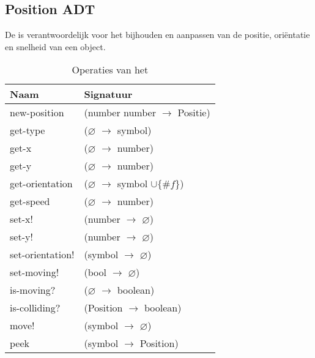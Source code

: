 \subsection{Position ADT}
\label{section:positie}

De \texttt{} is verantwoordelijk voor het bijhouden en aanpassen van de positie, oriëntatie en snelheid van een object.

\begin{table}[hbt]
\centering
\begin{tabular}{|ll|}
\hline
\rowcolor[HTML]{000000} 
{\color[HTML]{FFFFFF} \textbf{Naam}} & {\color[HTML]{FFFFFF} \textbf{Signatuur}} \\ \hline
new-position     & (number number $\rightarrow$ Positie)                       \\ \hline
get-type         & ($\varnothing$ $\rightarrow$ symbol)                        \\ \hline
get-x            & ($\varnothing$ $\rightarrow$ number)                        \\ \hline
get-y            & ($\varnothing$ $\rightarrow$ number)                        \\ \hline
get-orientation  & ($\varnothing$ $\rightarrow$ symbol $\cup\{\#f\}$)          \\ \hline
get-speed        & ($\varnothing$ $\rightarrow$ number)                        \\ \hline
set-x!           & (number $\rightarrow$ $\varnothing$)                        \\ \hline
set-y!           & (number $\rightarrow$ $\varnothing$)                        \\ \hline
set-orientation! & (symbol $\rightarrow$ $\varnothing$)                        \\ \hline
set-moving!      & (bool $\rightarrow$ $\varnothing$)                          \\ \hline
is-moving?       & ($\varnothing$ $\rightarrow$ boolean)                       \\ \hline
is-colliding?    & (Position $\rightarrow$ boolean)                            \\ \hline
move!            & (symbol $\rightarrow$ $\varnothing$)                        \\ \hline
peek             & (symbol $\rightarrow$ Position)                             \\ \hline
\end{tabular}
\caption{Operaties van het \texttt{}}
\label{table:positie}
\end{table}


